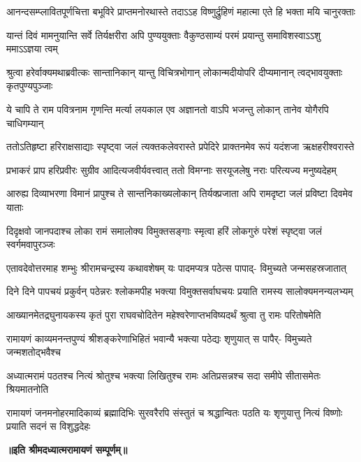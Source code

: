\fourlineindentedshloka
{आनन्दसम्प्लावितपूर्णचित्ता}
{बभूविरे प्राप्तमनोरथास्ते}
{तदाऽऽह विष्णुर्द्रुहिणं महात्मा}
{एते हि भक्ता मयि चानुरक्ताः} %

\fourlineindentedshloka
{यान्तं दिवं मामनुयान्ति सर्वे}
{तिर्यक्षरीरा अपि पुण्ययुक्ताः}
{वैकुण्ठसाम्यं परमं प्रयान्तु}
{समाविशस्वाऽऽशु ममाऽऽज्ञया त्वम्} %

\fourlineindentedshloka
{श्रुत्वा हरेर्वाक्यमथाब्रवीत्कः}
{सान्तानिकान् यान्तु विचित्रभोगान्}
{लोकान्मदीयोपरि दीप्यमानान्}
{त्वद्भावयुक्ताः कृतपुण्यपुञ्जाः} %

\fourlineindentedshloka
{ये चापि ते राम पवित्रनाम}
{गृणन्ति मर्त्या लयकाल एव}
{अज्ञानतो वाऽपि भजन्तु लोकान्}
{तानेव योगैरपि चाधिगम्यान्} %

\fourlineindentedshloka
{ततोऽतिहृष्टा हरिराक्षसाद्याः}
{स्पृष्ट्वा जलं त्यक्तकलेवरास्ते}
{प्रपेदिरे प्राक्तनमेव रूपं}
{यदंशजा ऋक्षहरीश्वरास्ते} %

\fourlineindentedshloka
{प्रभाकरं प्राप हरिप्रवीरः}
{सुग्रीव आदित्यजवीर्यवत्त्वात्}
{ततो विमग्नाः सरयूजलेषु}
{नराः परित्यज्य मनुष्यदेहम्} %

\fourlineindentedshloka
{आरुह्य दिव्याभरणा विमानं}
{प्रापुश्च ते सान्तनिकाख्यलोकान्}
{तिर्यक्प्रजाता अपि रामदृष्टा}
{जलं प्रविष्टा दिवमेव याताः} %

\fourlineindentedshloka
{दिदृक्षवो जानपदाश्च लोका}
{रामं समालोक्य विमुक्तसङ्गाः}
{स्मृत्वा हरिं लोकगुरुं परेशं}
{स्पृष्ट्वा जलं स्वर्गमवापुरञ्जः} %

\fourlineindentedshloka
{एतावदेवोत्तरमाह शम्भुः}
{श्रीरामचन्द्रस्य कथावशेषम्}
{यः पादमप्यत्र पठेत्स पापाद्-}
{विमुच्यते जन्मसहस्रजातात्} %

\fourlineindentedshloka
{दिने दिने पापचयं प्रकुर्वन्}
{पठेन्नरः श्लोकमपीह भक्त्या}
{विमुक्तसर्वाघचयः प्रयाति}
{रामस्य सालोक्यमनन्यलभ्यम्} %

\fourlineindentedshloka
{आख्यानमेतद्रघुनायकस्य}
{कृतं पुरा राघवचोदितेन}
{महेश्वरेणाप्तभविष्यदर्थं}
{श्रुत्वा तु रामः परितोषमेति} %

\fourlineindentedshloka
{रामायणं काव्यमनन्तपुण्यं}
{श्रीशङ्करेणाभिहितं भवान्यै}
{भक्त्या पठेद्यः शृणुयात् स पापैर्-}
{विमुच्यते जन्मशतोद्भवैश्च} %

\fourlineindentedshloka
{अध्यात्मरामं पठतश्च नित्यं}
{श्रोतुश्च भक्त्या लिखितुश्च रामः}
{अतिप्रसन्नश्च सदा समीपे}
{सीतासमेतः श्रियमातनोति} %

\fourlineindentedshloka
{रामायणं जनमनोहरमादिकाव्यं}
{ब्रह्मादिभिः सुरवरैरपि संस्तुतं च}
{श्रद्धान्वितः पठति यः शृणुयात्तु नित्यं}
{विष्णोः प्रयाति सदनं स विशुद्धदेहः} %



\textbf{॥इति श्रीमदध्यात्मरामायणं सम्पूर्णम्॥}
